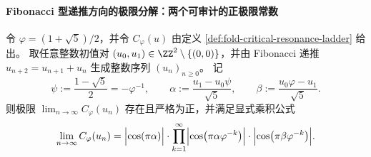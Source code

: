 \paragraph{Fibonacci 型递推方向的极限分解：两个可审计的正极限常数}
\begin{theorem}\label{thm:fold-resonance-ladder-fibonacci-directional-limit}
令 \(\varphi=(1+\sqrt5)/2\)，并令 \(C_\varphi(u)\) 由定义 \ref{def:fold-critical-resonance-ladder} 给出。
取任意整数初值对 \((u_0,u_1)\in\ZZ^2\setminus\{(0,0)\}\)，并由 Fibonacci 递推
\(
u_{n+2}=u_{n+1}+u_n
\)
生成整数序列 \((u_n)_{n\ge 0}\)。
记
\[
\psi:=\frac{1-\sqrt5}{2}=-\varphi^{-1},\qquad
\alpha:=\frac{u_1-u_0\psi}{\sqrt5},\qquad
\beta:=\frac{u_0\varphi-u_1}{\sqrt5}.
\]
则极限
\(
\lim_{n\to\infty} C_\varphi(u_n)
\)
存在且严格为正，并满足显式乘积公式
\[
\lim_{n\to\infty}C_\varphi(u_n)
=\Bigl|\cos(\pi\alpha)\Bigr|\cdot
\prod_{k=1}^{\infty}\Bigl|\cos\bigl(\pi\alpha\varphi^{-k}\bigr)\Bigr|\cdot
\Bigl|\cos\bigl(\pi\beta\varphi^{-k}\bigr)\Bigr|.
\]
\end{theorem}

